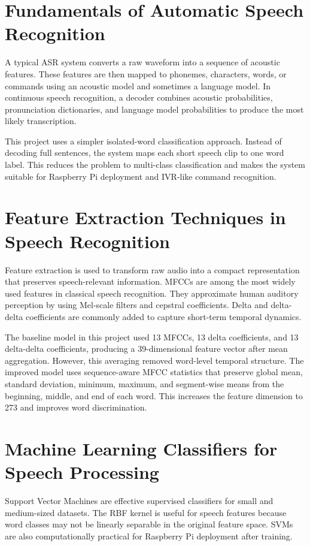 \documentclass[12pt,a4paper]{report}
\begin{document}
\section{Fundamentals of Automatic Speech Recognition}
A typical ASR system converts a raw waveform into a sequence of acoustic features. These features are then mapped to phonemes, characters, words, or commands using an acoustic model and sometimes a language model. In continuous speech recognition, a decoder combines acoustic probabilities, pronunciation dictionaries, and language model probabilities to produce the most likely transcription.

This project uses a simpler isolated-word classification approach. Instead of decoding full sentences, the system maps each short speech clip to one word label. This reduces the problem to multi-class classification and makes the system suitable for Raspberry Pi deployment and IVR-like command recognition.

\section{Feature Extraction Techniques in Speech Recognition}
Feature extraction is used to transform raw audio into a compact representation that preserves speech-relevant information. MFCCs are among the most widely used features in classical speech recognition. They approximate human auditory perception by using Mel-scale filters and cepstral coefficients. Delta and delta-delta coefficients are commonly added to capture short-term temporal dynamics.

The baseline model in this project used 13 MFCCs, 13 delta coefficients, and 13 delta-delta coefficients, producing a 39-dimensional feature vector after mean aggregation. However, this averaging removed word-level temporal structure. The improved model uses sequence-aware MFCC statistics that preserve global mean, standard deviation, minimum, maximum, and segment-wise means from the beginning, middle, and end of each word. This increases the feature dimension to 273 and improves word discrimination.

\section{Machine Learning Classifiers for Speech Processing}
Support Vector Machines are effective supervised classifiers for small and medium-sized datasets. The RBF kernel is useful for speech features because word classes may not be linearly separable in the original feature space. SVMs are also computationally practical for Raspberry Pi deployment after training.
\end{document}
